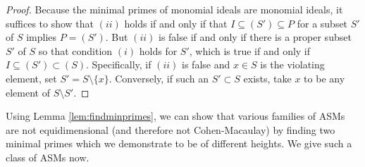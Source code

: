 \documentclass[12 pt]{amsart}
\theoremstyle{plain}
\theoremstyle{definition}
\theoremstyle{remark}
\begin{document}
{\begin{proof}
Because the minimal primes of monomial ideals are monomial ideals, it suffices to show that $(ii)$ holds if and only if that $I \subseteq (S') \subseteq P$ for a subset $S'$ of $S$ implies $P = (S')$.  But $(ii)$ is false if and only if there is a proper subset $S'$ of $S$ so that condition $(i)$ holds for $S'$, which is true if and only if $I \subseteq (S') \subset (S)$.  Specifically, if $(ii)$ is false and $x \in S$ is the violating element, set $S'  = S \setminus \{x\}$.  Conversely, if such an $S' \subset S$ exists, take $x$ to be any element of $S \setminus S'$.
\end{proof}

Using Lemma \ref{lem:findminprimes}, we can show that various families of ASMs are not equidimensional (and therefore not Cohen-Macaulay) by finding two minimal primes which we demonstrate to be of different heights. We give such a class of ASMs now.


\begin{figure}[h]
    \centering

\begin{tikzpicture}[x=0.9pt,y=0.9pt,yscale=-1,xscale=1]


\end{tikzpicture}
\end{figure}}
\end{document}

